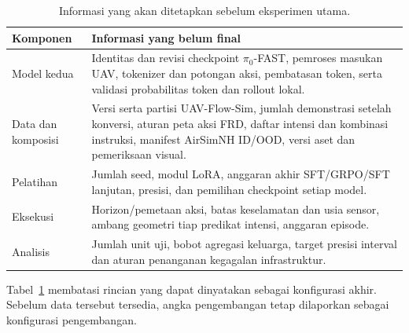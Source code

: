 \begin{table}[htbp]
\centering
\caption{Informasi yang akan ditetapkan sebelum eksperimen utama.}
\label{tab:parameter_terbuka}
\small
\begin{tabularx}{\linewidth}{|p{4cm}|X|}
\hline
\textbf{Komponen} & \textbf{Informasi yang belum final} \\
\hline
Model kedua & Identitas dan revisi checkpoint $\pi_0$-FAST, pemroses masukan UAV, tokenizer dan potongan aksi, pembatasan token, serta validasi probabilitas token dan rollout lokal. \\
\hline
Data dan komposisi & Versi serta partisi UAV-Flow-Sim, jumlah demonstrasi setelah konversi, aturan peta aksi FRD, daftar intensi dan kombinasi instruksi, manifest AirSimNH ID/OOD, versi aset dan pemeriksaan visual. \\
\hline
Pelatihan & Jumlah seed, modul LoRA, anggaran akhir SFT/GRPO/SFT lanjutan, presisi, dan pemilihan checkpoint setiap model. \\
\hline
Eksekusi & Horizon/pemetaan aksi, batas keselamatan dan usia sensor, ambang geometri tiap predikat intensi, anggaran episode. \\
\hline
Analisis & Jumlah unit uji, bobot agregasi keluarga, target presisi interval dan aturan penanganan kegagalan infrastruktur. \\
\hline
\end{tabularx}
\end{table}
Tabel~\ref{tab:parameter_terbuka} membatasi rincian yang dapat dinyatakan sebagai konfigurasi akhir. Sebelum data tersebut tersedia, angka pengembangan tetap dilaporkan sebagai konfigurasi pengembangan.
